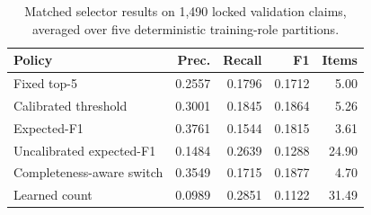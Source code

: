 \begin{table}[t]
\centering
\caption{Matched selector results on 1,490 locked validation claims, averaged over five deterministic training-role partitions.}
\label{tab:publication-selectors}
\small
\setlength{\tabcolsep}{3.5pt}
\begin{tabular}{@{}>{\raggedright\arraybackslash}p{}rrrr@{}}
\toprule
Policy & Prec. & Recall & F1 & Items \\
\midrule
Fixed top-5 & 0.2557 & 0.1796 & 0.1712 & 5.00 \\
Calibrated threshold & 0.3001 & 0.1845 & 0.1864 & 5.26 \\
Expected-F1 & 0.3761 & 0.1544 & 0.1815 & 3.61 \\
Uncalibrated expected-F1 & 0.1484 & 0.2639 & 0.1288 & 24.90 \\
Completeness-aware switch & 0.3549 & 0.1715 & 0.1877 & 4.70 \\
Learned count & 0.0989 & 0.2851 & 0.1122 & 31.49 \\
\bottomrule
\end{tabular}
\end{table}
